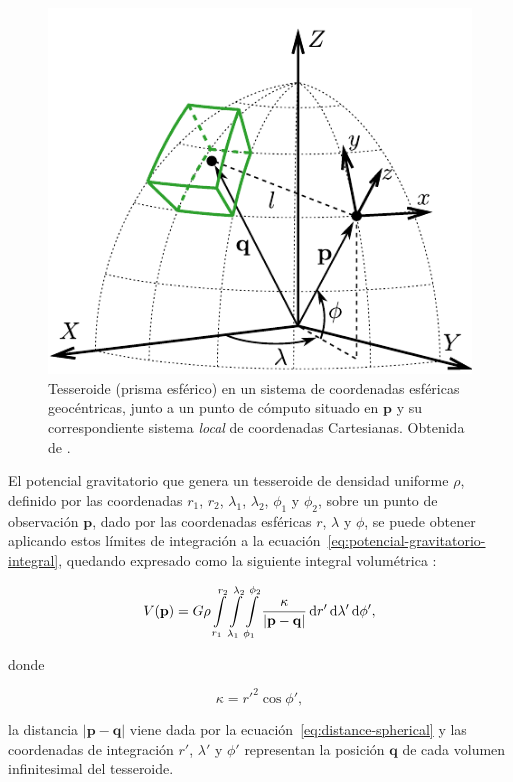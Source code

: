\begin{figure}
    \centering
    \includegraphics[width=0.7\linewidth]{figs/tesseroid-coord-sys.pdf}
    \caption{
        Tesseroide (prisma esférico) en un sistema de coordenadas esféricas
        geocéntricas, junto a un punto de cómputo situado en $\mathbf{p}$ y su
        correspondiente sistema \emph{local} de coordenadas Cartesianas.
        Obtenida de \citet{uieda2015}.
    }
    \label{fig:tesseroid}
\end{figure}

El potencial gravitatorio que genera un tesseroide de densidad uniforme $\rho$,
definido por las coordenadas $r_1$, $r_2$, $\lambda_1$, $\lambda_2$, $\phi_1$
y $\phi_2$, sobre un punto de observación $\mathbf{p}$, dado por las
coordenadas esféricas $r$, $\lambda$ y $\phi$, se puede obtener aplicando estos
límites de integración a la ecuación~\ref{eq:potencial-gravitatorio-integral},
quedando expresado como la siguiente integral volumétrica
\citep{grombein2013,uieda2016}:

\begin{equation}
    V(\mathbf{p}) = G \rho
        \int\limits_{r_1}^{r_2}
        \int\limits_{\lambda_1}^{\lambda_2}
        \int\limits_{\phi_1}^{\phi_2}
        \frac{\kappa}{|\mathbf{p} - \mathbf{q}|}
        \mathop{}\!\textnormal{d} r' \mathop{}\!\textnormal{d} \lambda' \mathop{}\!\textnormal{d} \phi',
    \label{eq:potencial-tesseroide}
\end{equation}

\noindent donde

\begin{equation}
    \kappa = {r'}^2 \cos \phi',
    \label{eq:kappa}
\end{equation}

\noindent la distancia $|\mathbf{p} - \mathbf{q}|$ viene dada por la
ecuación~\ref{eq:distance-spherical} y las coordenadas de integración $r'$,
$\lambda'$ y $\phi'$ representan la posición $\mathbf{q}$ de cada volumen
infinitesimal del tesseroide.

